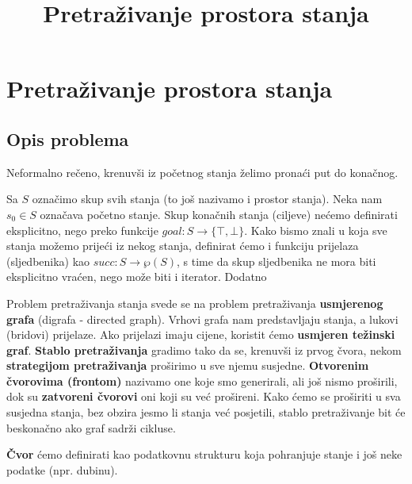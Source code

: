 \documentclass[12pt]{article}
\begin{document}
\title{Pretraživanje prostora stanja}

\section{Pretraživanje prostora stanja}

\subsection{Opis problema}

Neformalno rečeno, krenuvši iz početnog stanja želimo pronaći put do konačnog.

Sa $S$ označimo skup svih stanja (to još nazivamo i prostor stanja). Neka nam
$s_0 \in S$ označava početno stanje. Skup konačnih stanja (ciljeve) nećemo
definirati eksplicitno, nego preko funkcije $goal : S \rightarrow \lbrace \top,
\bot \rbrace$. Kako bismo znali u koja sve stanja možemo prijeći iz nekog
stanja, definirat ćemo i funkciju prijelaza (sljedbenika) kao $succ : S
\rightarrow \wp(S)$, s time da skup sljedbenika ne mora biti eksplicitno
vraćen, nego može biti i iterator. Dodatno

Problem pretraživanja stanja svede se na problem pretraživanja \textbf{
usmjerenog grafa} (digrafa - directed graph). Vrhovi grafa nam predstavljaju
stanja, a lukovi (bridovi) prijelaze. Ako prijelazi imaju cijene, koristit ćemo
\textbf{usmjeren težinski graf}. \textbf{Stablo pretraživanja} gradimo tako da
se, krenuvši iz prvog čvora, nekom \textbf{strategijom pretraživanja} proširimo
u sve njemu susjedne. \textbf{Otvorenim čvorovima (frontom)} nazivamo one koje
smo generirali, ali još nismo proširili, dok su \textbf{zatvoreni čvorovi} oni
koji su već prošireni. Kako ćemo se proširiti u sva susjedna stanja, bez obzira
jesmo li stanja već posjetili, stablo pretraživanje bit će beskonačno ako graf
sadrži cikluse. 

\textbf{Čvor} ćemo definirati kao podatkovnu strukturu koja pohranjuje stanje
i još neke podatke (npr. dubinu). 
\end{document}

